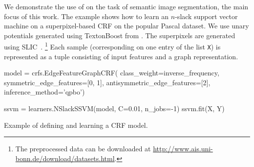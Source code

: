 %

We demonstrate the use of \pystruct on the task of semantic image segmentation,
the main focus of this work. The example shows how to learn an $n$-slack support
vector machine on a superpixel-based CRF on the popular Pascal dataset. We use
unary potentials generated using TextonBoost
from \citet{krahenbuhl2012efficient}. The superpixels are generated using SLIC~\citep{achanta2012slic}.%
\footnote{The preprocessed data can be downloaded at \url{http://www.ais.uni-bonn.de/download/datasets.html}.}
Each sample (corresponding on one entry of the list \texttt{X}) is represented as a
tuple consisting of input features and a graph representation.
\begin{listing}[t]
\begin{pythoncode}
model = crfs.EdgeFeatureGraphCRF(
            class_weight=inverse_frequency,
            symmetric_edge_features=[0, 1],
            antisymmetric_edge_features=[2],
            inference_method='qpbo')

ssvm = learners.NSlackSSVM(model, C=0.01, n_jobs=-1)
ssvm.fit(X, Y)
\end{pythoncode}
\caption{Example of defining and learning a CRF model.\label{lst:stuff}}
\end{listing}

